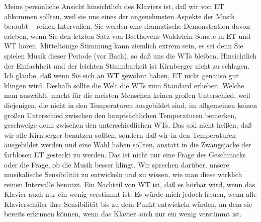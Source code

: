 Meine persönliche Ansicht hinsichtlich des Klaviers ist, daß wir von ET abkommen sollten, weil sie uns eines der angenehmsten Aspekte der Musik beraubt -- reinen Intervallen.
Sie werden eine dramatische Demonstration davon erleben, wenn Sie den letzten Satz von Beethovens Waldstein-Sonate in ET und WT hören.
Mitteltönige Stimmung kann ziemlich extrem sein, es sei denn Sie spielen Musik dieser Periode (vor Bach), so daß uns die WTs bleiben.
Hinsichtlich der Einfachheit und der leichten Stimmbarkeit ist Kirnberger nicht zu schlagen.
Ich glaube, daß wenn Sie sich an WT gewöhnt haben, ET nicht genauso gut klingen wird.
Deshalb sollte die Welt die WTs zum Standard erheben.
Welche man auswählt, macht für die meisten Menschen keinen großen Unterschied, weil diejenigen, die nicht in den Temperaturen ausgebildet sind, im allgemeinen keinen großen Unterschied zwischen den hauptsächlichen Temperaturen bemerken, geschweige denn zwischen den unterschiedlichen WTs.
Das soll nicht heißen, daß wir alle Kirnberger benutzen sollten, sondern daß wir in den Temperaturen ausgebildet werden und eine Wahl haben sollten, anstatt in die Zwangsjacke der farblosen ET gesteckt zu werden.
Das ist nicht nur eine Frage des Geschmacks oder die Frage, ob die Musik besser klingt.
Wir sprechen darüber, unsere musikalische Sensibilität zu entwickeln und zu wissen, wie man diese wirklich reinen Intervalle benutzt.
Ein Nachteil von WT ist, daß es hörbar wird, wenn das Klavier auch nur ein wenig verstimmt ist.
Es würde mich jedoch freuen, wenn alle Klavierschüler ihre Sensibilität bis zu dem Punkt entwickeln würden, an dem sie bereits erkennen können, wenn das Klavier auch nur ein wenig verstimmt ist.

